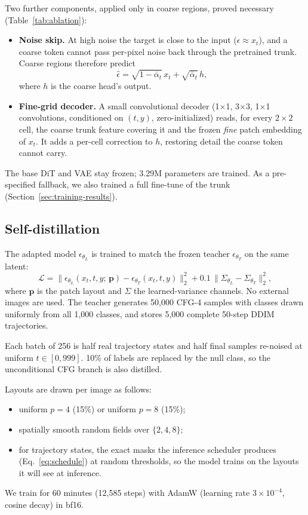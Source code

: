 Two further components, applied only in coarse regions, proved necessary (Table~\ref{tab:ablation}):
\begin{itemize}
  \item \textbf{Noise skip.} At high noise the target is close to the input ($\epsilon\approx x_t$), and a coarse token cannot pass
  per-pixel noise back through the pretrained trunk. Coarse regions therefore predict
  \begin{equation}
  \hat\epsilon=\sqrt{1-\bar\alpha_t}\,x_t+\sqrt{\bar\alpha_t}\,h,
  \label{eq:skip}
  \end{equation}
  where $h$ is the coarse head's output.
  \item \textbf{Fine-grid decoder.} A small convolutional decoder (1$\times$1, 3$\times$3, 1$\times$1 convolutions, conditioned on
  $(t,y)$, zero-initialized) reads, for every $2{\times}2$ cell, the coarse trunk feature covering it and the frozen \emph{fine}
  patch embedding of $x_t$. It adds a per-cell correction to $h$, restoring detail the coarse token cannot carry.
\end{itemize}
The base DiT and VAE stay frozen; 3.29M parameters are trained. As a pre-specified fallback, we also trained a full fine-tune of the
trunk (Section~\ref{sec:training-results}).

\subsection{Self-distillation}
\label{sec:distillation}
The adapted model $\epsilon_{\theta_L}$ is trained to match the frozen teacher $\epsilon_{\theta_T}$ on the same latent:
\begin{equation}
\mathcal{L}=\big\|\epsilon_{\theta_L}(x_t,t,y;\,\mathbf{p})-\epsilon_{\theta_T}(x_t,t,y)\big\|_2^2
+0.1\,\big\|\Sigma_{\theta_L}-\Sigma_{\theta_T}\big\|_2^2,
\label{eq:loss}
\end{equation}
where $\mathbf{p}$ is the patch layout and $\Sigma$ the learned-variance channels. No external images are used. The teacher generates
50,000 CFG-4 samples with classes drawn uniformly from all 1,000 classes, and stores 5,000 complete 50-step DDIM trajectories.

Each batch of 256 is half real trajectory states and half final samples re-noised at uniform $t\in[0,999]$. 10\% of labels are
replaced by the null class, so the unconditional CFG branch is also distilled.

Layouts are drawn per image as follows:
\begin{itemize}
  \item uniform $p{=}4$ (15\%) or uniform $p{=}8$ (15\%);
  \item spatially smooth random fields over $\{2,4,8\}$;
  \item for trajectory states, the exact masks the inference scheduler produces (Eq.~\ref{eq:schedule}) at random thresholds, so the
  model trains on the layouts it will see at inference.
\end{itemize}
We train for 60 minutes (12,585 steps) with AdamW (learning rate $3{\times}10^{-4}$, cosine decay) in bf16.


